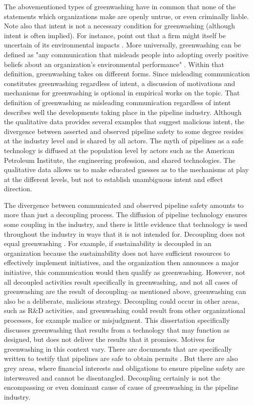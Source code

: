 The abovementioned types of greenwashing have in common that none of the statements which organizations make are openly untrue, or even criminally liable. Note also that intent is not a necessary condition for greenwashing (although intent is often implied). For instance, \citet{Lyon2011} point out that a firm might itself be uncertain of its environmental impacts \citep[pp. 26f]{Lyon2011}. More universally, greenwashing can be defined as "any communication that misleads people into adopting overly positive beliefs about an organization's environmental performance" \citep[p. 225]{Lyon2015}. Within that definition, greenwashing takes on different forms. 
Since misleading communication constitutes greenwashing regardless of intent, a discussion of motivations and mechanisms for greenwashing is optional in empirical works on the topic. That definition of greenwashing as misleading communication regardless of intent describes well the developments taking place in the pipeline industry. Although the qualitative data provides several examples that suggest malicious intent, the divergence between asserted and observed pipeline safety to some degree resides at the industry level and is shared by all actors. The myth of pipelines as a safe technology is diffused at the population level by actors such as the American Petroleum Institute, the engineering profession, and shared technologies. The qualitative data allows us to make educated guesses as to the mechanisms at play at the different levels, but not to establish unambiguous intent and effect direction.

The divergence between communicated and observed pipeline safety amounts to more than just a decoupling process. The diffusion of pipeline technology ensures some coupling in the industry, and there is little evidence that technology is used throughout the industry in ways that it is not intended for. Decoupling does not equal greenwashing \citep{Lyon2015}. For example, if sustainability is decoupled in an organization because the sustainability does not have sufficient resources to effectively implement initiatives, and the organization then announces a major initiative, this communication would then qualify as greenwashing. However, not all decoupled activities result specifically in greenwashing, and not all cases of greenwashing are the result of decoupling--as mentioned above, greenwashing can also be a deliberate, malicious strategy. Decoupling could occur in other areas, such as R\&D activities, and greenwashing could result from other organizational processes, for example malice or misjudgment. This dissertation specifically discusses greenwashing that results from a technology that may function as designed, but does not deliver the results that it promises. Motives for greenwashing in this context vary. There are documents that are specifically written to testify that pipelines are safe to obtain permits \citep[e.g., discussed in][]{Stansbury2011}. But there are also grey areas, where financial interests and obligations to ensure pipeline safety are interweaved and cannot be disentangled. Decoupling certainly is not the encompassing or even dominant cause of cause of greenwashing in the pipeline industry.